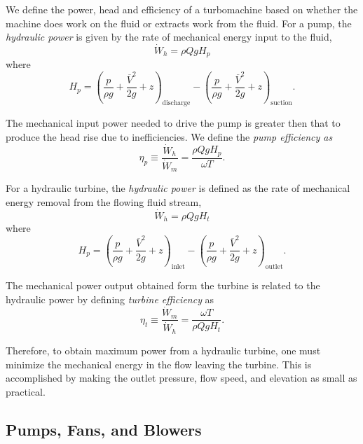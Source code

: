 We define the power, head and efficiency of a turbomachine based on whether the machine does work on the fluid or extracts work from the fluid.
For a pump, the \textit{hydraulic power} is given by the rate of mechanical energy input to the fluid,
\begin{equation*}
  \dot{W}_h = \rho Q g H_p
\end{equation*}
where
\begin{equation*}
  H_p = \left( \frac{p}{\rho g} + \frac{\overline{V}^2}{2g} + z \right)_{\text{discharge}} - \left( \frac{p}{\rho g} + \frac{\overline{V}^2}{2g} + z \right)_{\text{suction}}
.\end{equation*}

The mechanical input power needed to drive the pump is greater then that to produce the head rise due to inefficiencies.
We define the \textit{pump efficiency as}
\begin{equation*}
  \eta_p \equiv \frac{\dot{W}_h}{\dot{W}_m} = \frac{\rho Q g H_p}{\omega T}
.\end{equation*}

For a hydraulic turbine, the \textit{hydraulic power} is defined as the rate of mechanical energy removal from the flowing fluid stream,
\begin{equation*}
  \dot{W}_h = \rho Q g H_t
\end{equation*}
where
\begin{equation*}
  H_p = \left( \frac{p}{\rho g} + \frac{\overline{V}^2}{2g} + z \right)_{\text{inlet}} - \left( \frac{p}{\rho g} + \frac{\overline{V}^2}{2g} + z \right)_{\text{outlet}}
.\end{equation*}

The mechanical power output obtained form the turbine is related to the hydraulic power by defining \textit{turbine efficiency} as
\begin{equation*}
  \eta_t \equiv \frac{\dot{W}_m}{\dot{W}_h} = \frac{\omega T}{\rho Q g H_t}
.\end{equation*}

Therefore, to obtain maximum power from a hydraulic turbine, one must minimize the mechanical energy in the flow leaving the turbine.
This is accomplished by making the outlet pressure, flow speed, and elevation as small as practical.

\subsection{Pumps, Fans, and Blowers}

